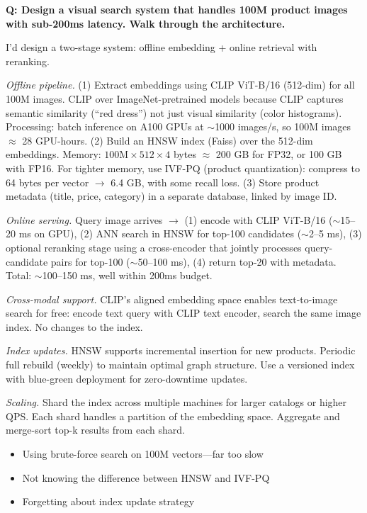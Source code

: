 \begin{interviewq}
\textbf{Q: Design a visual search system that handles 100M product images with sub-200ms latency. Walk through the architecture.}

 \quad {} \quad \badgefreq{\freqmed}

\stronganswer I'd design a two-stage system: offline embedding + online retrieval with reranking.

\textit{Offline pipeline.} (1) Extract embeddings using CLIP ViT-B/16 (512-dim) for all 100M images. CLIP over ImageNet-pretrained models because CLIP captures semantic similarity (``red dress'') not just visual similarity (color histograms). Processing: batch inference on A100 GPUs at $\sim$1000 images/s, so 100M images $\approx$ 28 GPU-hours. (2) Build an HNSW index (Faiss) over the 512-dim embeddings. Memory: $100\text{M} \times 512 \times 4$ bytes $\approx$ 200 GB for FP32, or 100 GB with FP16. For tighter memory, use IVF-PQ (product quantization): compress to 64 bytes per vector $\to$ 6.4 GB, with some recall loss. (3) Store product metadata (title, price, category) in a separate database, linked by image ID.

\textit{Online serving.} Query image arrives $\to$ (1) encode with CLIP ViT-B/16 ($\sim$15--20 ms on GPU), (2) ANN search in HNSW for top-100 candidates ($\sim$2--5 ms), (3) optional reranking stage using a cross-encoder that jointly processes query-candidate pairs for top-100 ($\sim$50--100 ms), (4) return top-20 with metadata. Total: $\sim$100--150 ms, well within 200ms budget.

\textit{Cross-modal support.} CLIP's aligned embedding space enables text-to-image search for free: encode text query with CLIP text encoder, search the same image index. No changes to the index.

\textit{Index updates.} HNSW supports incremental insertion for new products. Periodic full rebuild (weekly) to maintain optimal graph structure. Use a versioned index with blue-green deployment for zero-downtime updates.

\textit{Scaling.} Shard the index across multiple machines for larger catalogs or higher QPS. Each shard handles a partition of the embedding space. Aggregate and merge-sort top-k results from each shard.

\redflags
\begin{itemize}
    \item Using brute-force search on 100M vectors---far too slow
    \item Not knowing the difference between HNSW and IVF-PQ
    \item Forgetting about index update strategy
\end{itemize}


\end{interviewq}
